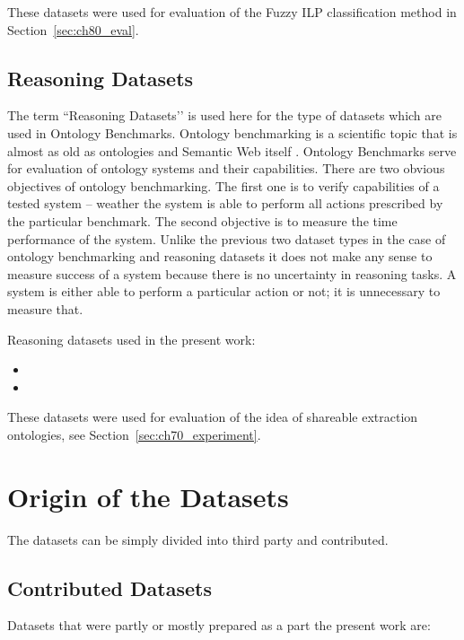 These datasets were used for evaluation of the Fuzzy ILP classification method in Section~\ref{sec:ch80_eval}. 


\subsection{Reasoning Datasets}


The term ``Reasoning Datasets’’ is used here for the type of datasets which are used in Ontology Benchmarks. Ontology benchmarking is a scientific topic that is almost as old as ontologies and Semantic Web itself \citep{DBLP:conf/semweb/GuoHP03}. Ontology Benchmarks serve for evaluation of ontology systems and their capabilities. There are two obvious objectives of ontology benchmarking. The first one is to verify capabilities of a tested system -- weather the system is able to perform all actions prescribed by the particular benchmark. The second objective is to measure the time performance of the system. Unlike the previous two dataset types in the case of ontology benchmarking and reasoning datasets it does not make any sense to measure success of a system because there is no uncertainty in reasoning tasks. A system is either able to perform a particular action or not; it is unnecessary to measure that. 

Reasoning datasets used in the present work:
\begin{itemize}
	\item {}
	\item {}
\end{itemize}

These datasets were used for evaluation of the idea of shareable extraction ontologies, see Section~\ref{sec:ch70_experiment}. 

\section{Origin of the Datasets}
The datasets can be simply divided into third party and contributed. 
\subsection{Contributed Datasets}
Datasets that were partly or mostly prepared as a part the present work are:


